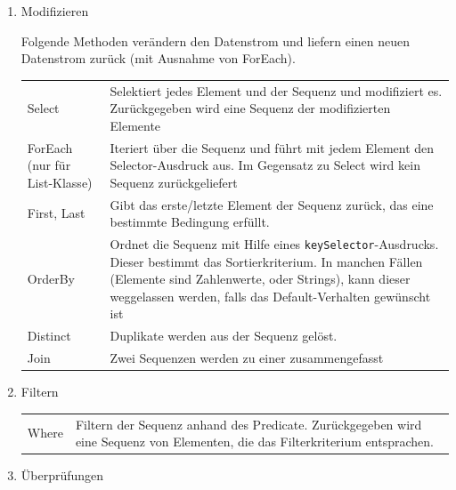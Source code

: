 \documentclass[a4paper,12pt,oneside]{book}
\begin{document}
\begin{enumerate}
\item Modifizieren

\label{sec-4-3-1-1}
Folgende Methoden verändern den Datenstrom und liefern einen neuen Datenstrom
zurück (mit Ausnahme von ForEach).
\begin{center}
	\bgroup
	\def\arraystretch{1.5}%
	\begin{tabularx}{\textwidth}{|p{5cm}|X|}
Select & Selektiert jedes Element und der Sequenz und modifiziert es. Zurückgegeben wird eine Sequenz der modifizierten Elemente\\
ForEach (nur für List-Klasse) & Iteriert über die Sequenz und führt mit jedem Element den Selector-Ausdruck aus. Im Gegensatz zu Select wird kein Sequenz zurückgeliefert\\
First,  Last & Gibt das erste/letzte Element der Sequenz zurück, das eine bestimmte Bedingung erfüllt.\\
OrderBy & Ordnet die Sequenz mit Hilfe eines \texttt{keySelector}-Ausdrucks. Dieser bestimmt das Sortierkriterium. In manchen Fällen (Elemente sind Zahlenwerte, oder Strings), kann dieser weggelassen werden, falls das Default-Verhalten gewünscht ist\\
Distinct & Duplikate werden aus der Sequenz gelöst.\\
Join & Zwei Sequenzen werden zu einer zusammengefasst\\
\end{tabularx}
\egroup
\end{center}

\item Filtern
\label{sec-4-3-1-2}

\begin{center}
	\bgroup
	\def\arraystretch{1.5}%
	\begin{tabularx}{\textwidth}{|p{5cm}|X|}
Where & Filtern der Sequenz anhand des Predicate. Zurückgegeben wird eine Sequenz von Elementen, die das Filterkriterium entsprachen.\\
\end{tabularx}
\egroup
\end{center}
\item Überprüfungen


\end{enumerate}
\end{document}
